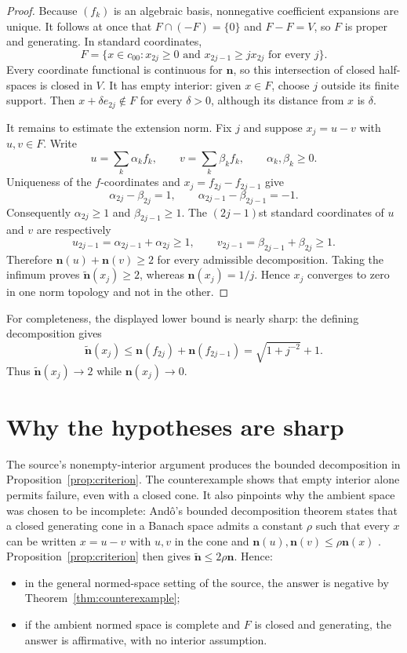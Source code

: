 \documentclass[11pt]{article}
\newcommand{\ctz}{c_{00}}
\begin{document}
\begin{proof}
Because $(f_k)$ is an algebraic basis, nonnegative coefficient expansions
are unique.  It follows at once that $F\cap(-F)=\{0\}$ and
$F-F=V$, so $F$ is proper and generating.  In standard coordinates,
\[
 F=\{x\in\ctz:x_{2j}\ge0\text{ and }
                     x_{2j-1}\ge jx_{2j}\text{ for every }j\}.
\]
Every coordinate functional is continuous for $\mathbf n$, so this
intersection of closed half-spaces is closed in $V$.  It has empty interior:
given $x\in F$, choose $j$ outside its finite support.  Then
$x+\delta e_{2j}\notin F$ for every $\delta>0$, although its distance from
$x$ is $\delta$.

It remains to estimate the extension norm.  Fix $j$ and suppose
$x_j=u-v$ with $u,v\in F$.  Write
\[
 u=\sum_k\alpha_k f_k,\qquad
 v=\sum_k\beta_k f_k,
 \qquad \alpha_k,\beta_k\ge0.
\]
Uniqueness of the $f$-coordinates and
$x_j=f_{2j}-f_{2j-1}$ give
\[
 \alpha_{2j}-\beta_{2j}=1,
 \qquad
 \alpha_{2j-1}-\beta_{2j-1}=-1.
\]
Consequently $\alpha_{2j}\ge1$ and $\beta_{2j-1}\ge1$.  The
$(2j-1)$st standard coordinates of $u$ and $v$ are respectively
\[
 u_{2j-1}=\alpha_{2j-1}+\alpha_{2j}\ge1,
 \qquad
 v_{2j-1}=\beta_{2j-1}+\beta_{2j}\ge1.
\]
Therefore
$\mathbf n(u)+\mathbf n(v)\ge2$ for every admissible decomposition.
Taking the infimum proves $\widetilde{\mathbf n}(x_j)\ge2$, whereas
$\mathbf n(x_j)=1/j$.  Hence $x_j$ converges to zero in one norm topology
and not in the other.
\end{proof}

For completeness, the displayed lower bound is nearly sharp: the defining
decomposition gives
\[
 \widetilde{\mathbf n}(x_j)
 \le \mathbf n(f_{2j})+\mathbf n(f_{2j-1})
 =\sqrt{1+j^{-2}}+1.
\]
Thus $\widetilde{\mathbf n}(x_j)\to2$ while
$\mathbf n(x_j)\to0$.

\section{Why the hypotheses are sharp}

The source's nonempty-interior argument produces the bounded decomposition
in Proposition~\ref{prop:criterion}.  The counterexample shows that empty
interior alone permits failure, even with a closed cone.  It also pinpoints
why the ambient space was chosen to be incomplete: And\^o's bounded
decomposition theorem states that a closed generating cone in a Banach space
admits a constant $\rho$ such that every $x$ can be written $x=u-v$ with
$u,v$ in the cone and
$\mathbf n(u),\mathbf n(v)\le\rho\mathbf n(x)$ \cite[Lemma 1]{Ando}.
Proposition~\ref{prop:criterion} then gives
$\widetilde{\mathbf n}\le2\rho\mathbf n$.  Hence:
\begin{itemize}
\item in the general normed-space setting of the source, the answer is
negative by Theorem~\ref{thm:counterexample};
\item if the ambient normed space is complete and $F$ is closed and
generating, the answer is affirmative, with no interior assumption.
\end{itemize}
\end{document}
